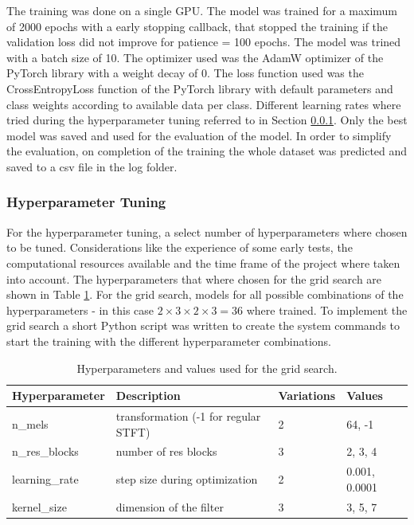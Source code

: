 The training was done on a single GPU. The model was trained for a maximum of 2000 epochs
with a early stopping callback, that stopped the training if the validation loss did not improve
for patience = 100 epochs. The model was trined with a batch size of 10. The optimizer used was the AdamW
optimizer of the PyTorch library with a weight decay of 0. The loss function used was the
CrossEntropyLoss function of the PyTorch library with default parameters and class weights
according to available data per class. Different learning rates where tried during the hyperparameter
tuning referred to in Section \ref{hyperparameter_tuning}. Only the best model was saved and used for
the evaluation of the model. In order to simplify the evaluation, on completion of the training
the whole dataset was predicted and saved to a csv file in the log folder.

\subsubsection{Hyperparameter Tuning}%
\label{hyperparameter_tuning}

For the hyperparameter tuning, a select number of hyperparameters where chosen to be tuned.
Considerations like the experience of some early tests, the computational resources available
and the time frame of the project where taken into account. The hyperparameters that where
chosen for the grid search are shown in Table \ref{tab:hyperparameters}. For the grid search,
models for all possible combinations of the hyperparameters - 
in this case \( 2 \times 3 \times 2 \times 3 = 36 \) where trained. To implement the grid search a short Python
script was written to create the system commands to start the training with the different
hyperparameter combinations.
\begin{table}[h]
    \centering
    \caption{Hyperparameters and values used for the grid search.}
    \label{tab:hyperparameters}
    \begin{tabular}{llll}
    \toprule
    \textbf{Hyperparameter} & \textbf{Description}                  & \textbf{Variations}   & \textbf{Values} \\
    \midrule
    n\_mels                 & transformation (-1 for regular STFT)  & 2                     & 64, -1 \\
    n\_res\_blocks          & number of res blocks                  & 3                     & 2, 3, 4 \\
    learning\_rate          & step size during optimization         & 2                     & 0.001, 0.0001 \\
    kernel\_size            & dimension of the filter               & 3                     & 3, 5, 7 \\
    \bottomrule
\end{tabular}

\end{table}

